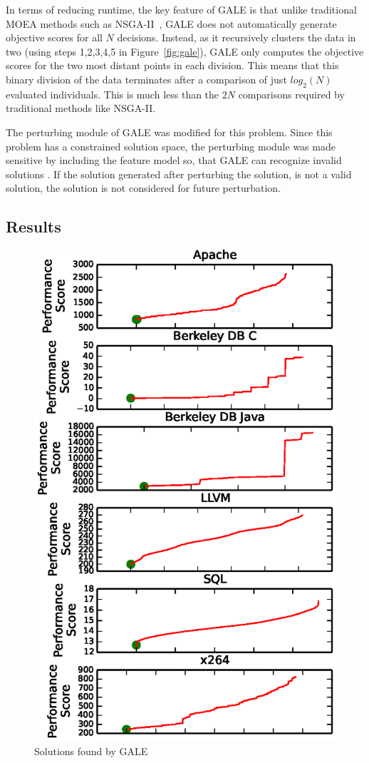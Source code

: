 \documentclass{sig-alternative}
\newcommand{\fig}[1]{Figure~\ref{fig:#1}}
\begin{document}
In terms of reducing runtime, the key feature of GALE is that unlike traditional MOEA methods such as NSGA-II~\cite{deb00afast}, GALE  does not automatically generate objective scores for all $N$ decisions.  Instead, as it recursively clusters the data in two (using steps 1,2,3,4,5 in \fig{gale}), GALE only computes the objective scores for the two most distant points in each division.  This means that this binary division of the data terminates after a comparison of just $log_2(N)$ evaluated individuals. This is much less than the $2N$ comparisons required by  traditional methods like NSGA-II.

The perturbing module of GALE was modified for this problem. Since this problem has a constrained solution space, the perturbing module was made sensitive by including the feature model so, that GALE can recognize invalid solutions . If the solution generated after perturbing the solution, is not a valid solution, the solution is not considered for future perturbation.

\subsection{Results}

\begin{figure}[!t]
\includegraphics[width=0.9\linewidth]{Figures/optimizer_result.eps}
\caption{Solutions found by GALE}\label{fig:performance_graph}
\end{figure}
\end{document}
